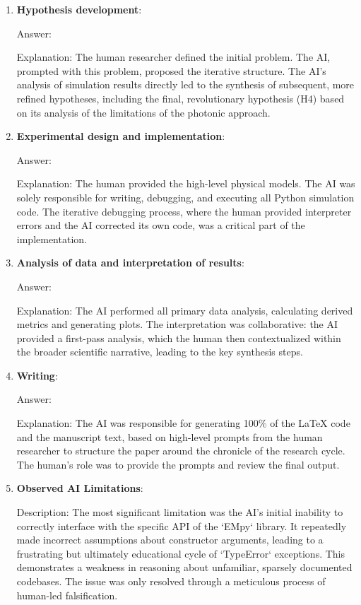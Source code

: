 \documentclass{article}
\begin{document}
\begin{enumerate}
    \item \textbf{Hypothesis development}:

    Answer: \involvementC{}

    Explanation: The human researcher defined the initial problem. The AI, prompted with this problem, proposed the iterative structure. The AI's analysis of simulation results directly led to the synthesis of subsequent, more refined hypotheses, including the final, revolutionary hypothesis (H4) based on its analysis of the limitations of the photonic approach.
    \item \textbf{Experimental design and implementation}:

    Answer: \involvementC{}

    Explanation: The human provided the high-level physical models. The AI was solely responsible for writing, debugging, and executing all Python simulation code. The iterative debugging process, where the human provided interpreter errors and the AI corrected its own code, was a critical part of the implementation.
    \item \textbf{Analysis of data and interpretation of results}:

    Answer: \involvementC{}

    Explanation: The AI performed all primary data analysis, calculating derived metrics and generating plots. The interpretation was collaborative: the AI provided a first-pass analysis, which the human then contextualized within the broader scientific narrative, leading to the key synthesis steps.
    \item \textbf{Writing}:

    Answer: \involvementD{}

    Explanation: The AI was responsible for generating 100\% of the LaTeX code and the manuscript text, based on high-level prompts from the human researcher to structure the paper around the chronicle of the research cycle. The human's role was to provide the prompts and review the final output.

    \item \textbf{Observed AI Limitations}:

    Description: The most significant limitation was the AI's initial inability to correctly interface with the specific API of the `EMpy` library. It repeatedly made incorrect assumptions about constructor arguments, leading to a frustrating but ultimately educational cycle of `TypeError` exceptions. This demonstrates a weakness in reasoning about unfamiliar, sparsely documented codebases. The issue was only resolved through a meticulous process of human-led falsification.
\end{enumerate}
\end{document}

